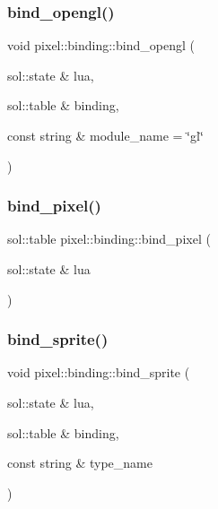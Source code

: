 \mbox{\label{namespacepixel_1_1binding_aba74c7113476d1ba0aeaf6d396ccc7b0}} 
\subsubsection{\texorpdfstring{bind\+\_\+opengl()}{bind\_opengl()}}
{\footnotesize\ttfamily void pixel\+::binding\+::bind\+\_\+opengl (\begin{DoxyParamCaption}\item[{sol\+::state \&}]{lua,  }\item[{sol\+::table \&}]{binding,  }\item[{const string \&}]{module\+\_\+name = {\ttfamily \char`\"{}gl\char`\"{}} }\end{DoxyParamCaption})}

\mbox{\label{namespacepixel_1_1binding_ab272e0e67cf55a0e247549bb29b1deda}} 
\subsubsection{\texorpdfstring{bind\+\_\+pixel()}{bind\_pixel()}}
{\footnotesize\ttfamily sol\+::table pixel\+::binding\+::bind\+\_\+pixel (\begin{DoxyParamCaption}\item[{sol\+::state \&}]{lua }\end{DoxyParamCaption})}

\mbox{\label{namespacepixel_1_1binding_a71a96e382c301a5b48e0ff142a6ebb35}} 
\subsubsection{\texorpdfstring{bind\+\_\+sprite()}{bind\_sprite()}}
{\footnotesize\ttfamily void pixel\+::binding\+::bind\+\_\+sprite (\begin{DoxyParamCaption}\item[{sol\+::state \&}]{lua,  }\item[{sol\+::table \&}]{binding,  }\item[{const string \&}]{type\+\_\+name }\end{DoxyParamCaption})}


